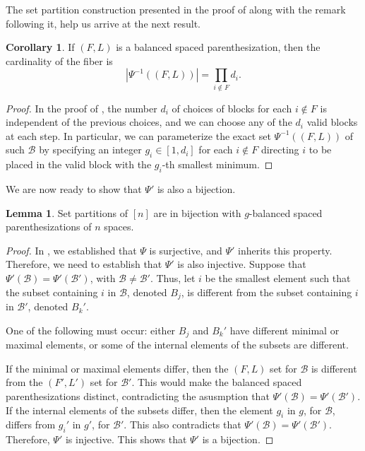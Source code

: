 \documentclass{amsart}
\newcommand{\mB}{\mathcal B}
\theoremstyle{definition}
\newtheorem{corollary}{Corollary}[section]
\newtheorem{lemma}[theorem]{Lemma}
\theoremstyle{definition}
\theoremstyle{remark}
\begin{document}
The set partition construction presented in the proof of  along with the remark following it, help us arrive at the next result.

\begin{corollary}
    If $(F,L)$ is a balanced spaced parenthesization, then the cardinality of the fiber is 
    \[
    |\Psi^{-1}((F,L))| = \prod_{i\notin F}d_i.
    \]

\end{corollary}
\begin{proof}
    In the proof of , the number $d_i$ of choices of blocks for each $i\notin F$ is independent of the previous choices, and we can choose any of the $d_i$ valid blocks at each step. In particular, we can parameterize the exact set $\Psi^{-1}((F,L))$ of such $\mB$ by specifying an integer $g_i\in[1,d_i]$ for each $i\notin F$ directing $i$ to be placed in the valid block with the $g_i$-th smallest minimum.
\end{proof}



We are now ready to show that $\Psi'$ is also a bijection.

\begin{lemma}\label{lem:Pi <-> BSP}
    Set partitions of $[n]$ are in bijection with $g$-balanced spaced parenthesizations of $n$ spaces.
\end{lemma}

\begin{proof}
In , we established that $\Psi$ is surjective, and $\Psi'$ inherits this property. 
Therefore, we need to establish that $\Psi'$ is also injective.
Suppose that $\Psi'(\mathcal{B})=\Psi'(\mathcal{B}')$, with $\mathcal{B}\neq \mathcal{B}'$.
Thus, let
$i$ be the smallest element such that the subset containing $i$ in $\mathcal{B}$, denoted $B_j$,  is different from the subset containing $i$ in $ \mathcal{B}'$, denoted  $B_k'$.

One of the following must occur: either $B_j$ and $B_k'$ have different minimal or maximal elements, or some of the internal elements of the subsets are different. 

If the minimal or maximal elements differ, then the $(F,L)$ set for $\mathcal{B}$ is different from the $(F',L')$ set for $\mathcal{B}'$. This would make the balanced spaced parenthesizations distinct, contradicting the asusmption that $\Psi'(\mB)=\Psi'(\mB')$. 
If the internal elements of the subsets differ, then the element $g_i$ in $g$, for $\mathcal{B}$,  differs from  $g_i'$ in $g'$, for $\mathcal{B}'$. 
This also contradicts that $\Psi'(\mathcal{B})=\Psi'(\mathcal{B}')$. 
Therefore, $\Psi'$ is injective.
This shows that $\Psi'$ is a bijection.
\end{proof}
\end{document}
